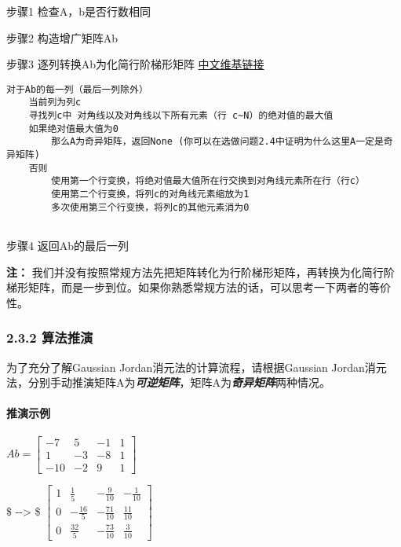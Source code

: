 \documentclass[11pt]{article}
\begin{document}
步骤1 检查A，b是否行数相同

步骤2 构造增广矩阵Ab

步骤3 逐列转换Ab为化简行阶梯形矩阵
\href{https://zh.wikipedia.org/wiki/\%E9\%98\%B6\%E6\%A2\%AF\%E5\%BD\%A2\%E7\%9F\%A9\%E9\%98\%B5\#.E5.8C.96.E7.AE.80.E5.90.8E.E7.9A.84-.7Bzh-hans:.E8.A1.8C.3B_zh-hant:.E5.88.97.3B.7D-.E9.98.B6.E6.A2.AF.E5.BD.A2.E7.9F.A9.E9.98.B5}{中文维基链接}

\begin{verbatim}
对于Ab的每一列（最后一列除外）
    当前列为列c
    寻找列c中 对角线以及对角线以下所有元素（行 c~N）的绝对值的最大值
    如果绝对值最大值为0
        那么A为奇异矩阵，返回None (你可以在选做问题2.4中证明为什么这里A一定是奇异矩阵)
    否则
        使用第一个行变换，将绝对值最大值所在行交换到对角线元素所在行（行c） 
        使用第二个行变换，将列c的对角线元素缩放为1
        多次使用第三个行变换，将列c的其他元素消为0
        
\end{verbatim}

步骤4 返回Ab的最后一列

\textbf{注：}
我们并没有按照常规方法先把矩阵转化为行阶梯形矩阵，再转换为化简行阶梯形矩阵，而是一步到位。如果你熟悉常规方法的话，可以思考一下两者的等价性。

    \subsubsection{2.3.2 算法推演}\label{ux7b97ux6cd5ux63a8ux6f14}

为了充分了解Gaussian Jordan消元法的计算流程，请根据Gaussian
Jordan消元法，分别手动推演矩阵A为\textbf{\emph{可逆矩阵}}，矩阵A为\textbf{\emph{奇异矩阵}}两种情况。

    \paragraph{推演示例}\label{ux63a8ux6f14ux793aux4f8b}

\(Ab = \begin{bmatrix}  -7 & 5 & -1 & 1\\  1 & -3 & -8 & 1\\  -10 & -2 & 9 & 1\end{bmatrix}\)

\$ -\/-\textgreater{} \$
\(\begin{bmatrix}  1 & \frac{1}{5} & -\frac{9}{10} & -\frac{1}{10}\\  0 & -\frac{16}{5} & -\frac{71}{10} & \frac{11}{10}\\  0 & \frac{32}{5} & -\frac{73}{10} & \frac{3}{10}\end{bmatrix}\)
\end{document}
